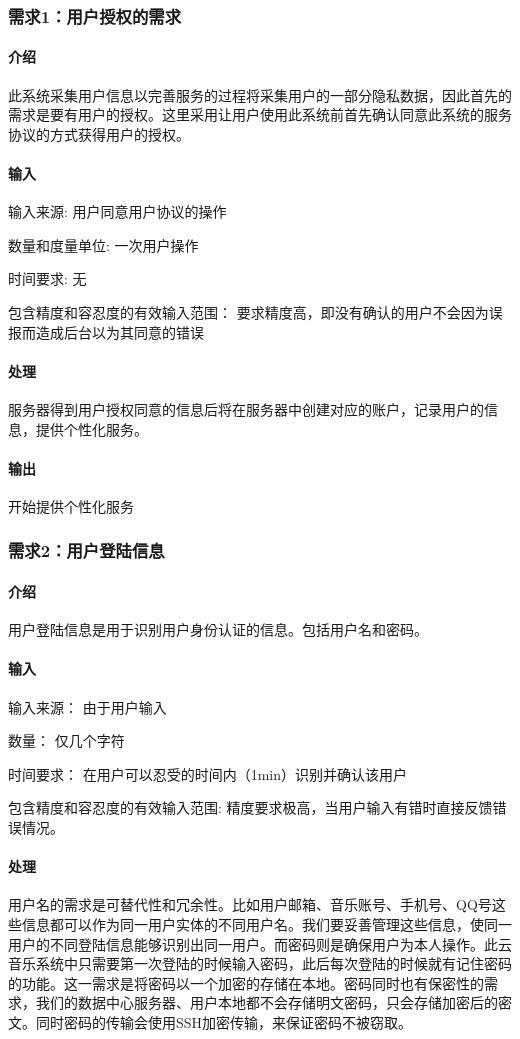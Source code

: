 \subsubsection{需求1：用户授权的需求}
\paragraph{介绍}
此系统采集用户信息以完善服务的过程将采集用户的一部分隐私数据，因此首先的需求是要有用户的授权。这里采用让用户使用此系统前首先确认同意此系统的服务协议的方式获得用户的授权。
\paragraph{输入}
输入来源:
用户同意用户协议的操作

数量和度量单位:
一次用户操作

时间要求:
无

包含精度和容忍度的有效输入范围：
要求精度高，即没有确认的用户不会因为误报而造成后台以为其同意的错误
\paragraph{处理}
服务器得到用户授权同意的信息后将在服务器中创建对应的账户，记录用户的信息，提供个性化服务。
\paragraph{输出}
开始提供个性化服务

\subsubsection{需求2：用户登陆信息}
\paragraph{介绍}
用户登陆信息是用于识别用户身份认证的信息。包括用户名和密码。

\paragraph{输入}

输入来源：
由于用户输入

数量：
仅几个字符

时间要求：
在用户可以忍受的时间内（1min）识别并确认该用户

包含精度和容忍度的有效输入范围:
精度要求极高，当用户输入有错时直接反馈错误情况。

\paragraph{处理}
用户名的需求是可替代性和冗余性。比如用户邮箱、音乐账号、手机号、QQ号这些信息都可以作为同一用户实体的不同用户名。我们要妥善管理这些信息，使同一用户的不同登陆信息能够识别出同一用户。而密码则是确保用户为本人操作。此云音乐系统中只需要第一次登陆的时候输入密码，此后每次登陆的时候就有记住密码的功能。这一需求是将密码以一个加密的存储在本地。密码同时也有保密性的需求，我们的数据中心服务器、用户本地都不会存储明文密码，只会存储加密后的密文。同时密码的传输会使用SSH加密传输，来保证密码不被窃取。

